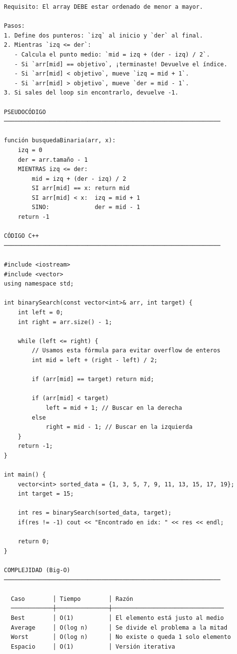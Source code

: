 \begin{lstlisting}
Requisito: El array DEBE estar ordenado de menor a mayor.

Pasos:
1. Define dos punteros: `izq` al inicio y `der` al final.
2. Mientras `izq <= der`:
   - Calcula el punto medio: `mid = izq + (der - izq) / 2`.
   - Si `arr[mid] == objetivo`, ¡terminaste! Devuelve el índice.
   - Si `arr[mid] < objetivo`, mueve `izq = mid + 1`.
   - Si `arr[mid] > objetivo`, mueve `der = mid - 1`.
3. Si sales del loop sin encontrarlo, devuelve -1.

PSEUDOCÓDIGO
──────────────────────────────────────────────────────────────

función busquedaBinaria(arr, x):
    izq = 0
    der = arr.tamaño - 1
    MIENTRAS izq <= der:
        mid = izq + (der - izq) / 2
        SI arr[mid] == x: return mid
        SI arr[mid] < x:  izq = mid + 1
        SINO:             der = mid - 1
    return -1

CÓDIGO C++
──────────────────────────────────────────────────────────────

#include <iostream>
#include <vector>
using namespace std;

int binarySearch(const vector<int>& arr, int target) {
    int left = 0;
    int right = arr.size() - 1;

    while (left <= right) {
        // Usamos esta fórmula para evitar overflow de enteros
        int mid = left + (right - left) / 2;

        if (arr[mid] == target) return mid;
        
        if (arr[mid] < target)
            left = mid + 1; // Buscar en la derecha
        else
            right = mid - 1; // Buscar en la izquierda
    }
    return -1;
}

int main() {
    vector<int> sorted_data = {1, 3, 5, 7, 9, 11, 13, 15, 17, 19};
    int target = 15;

    int res = binarySearch(sorted_data, target);
    if(res != -1) cout << "Encontrado en idx: " << res << endl;
    
    return 0;
}

COMPLEJIDAD (Big-O)
──────────────────────────────────────────────────────────────

  Caso        │ Tiempo        │ Razón
  ────────────┼───────────────┼────────────────────────────────
  Best        │ O(1)          │ El elemento está justo al medio
  Average     │ O(log n)      │ Se divide el problema a la mitad
  Worst       │ O(log n)      │ No existe o queda 1 solo elemento
  Espacio     │ O(1)          │ Versión iterativa
\end{lstlisting}

